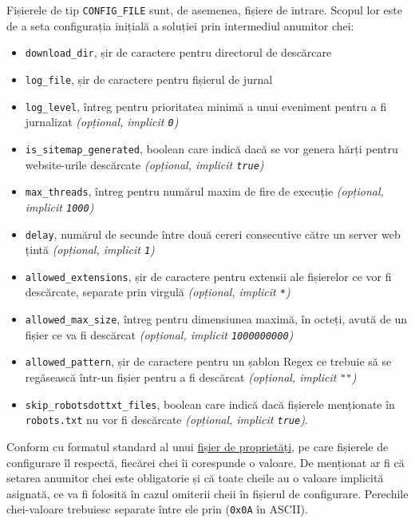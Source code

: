 \documentclass[12pt]{article}
\begin{document}
Fișierele de tip \texttt{CONFIG_FILE} sunt, de asemenea, fișiere de intrare. Scopul lor este de a seta configurația inițială a soluției prin intermediul anumitor chei:
\begin{itemize}
   \item \texttt{download_dir}, șir de caractere pentru directorul de descărcare
    \item \texttt{log_file}, șir de caractere pentru fișierul de jurnal
    \item \texttt{log_level}, întreg pentru prioritatea minimă a unui eveniment pentru a fi jurnalizat \textit{(opțional, implicit \texttt{0})}
    \item \texttt{is_sitemap_generated}, boolean care indică dacă se vor genera hărți pentru website-urile descărcate \textit{(opțional, implicit \texttt{true})}
    \item \texttt{max_threads}, întreg pentru numărul maxim de fire de execuție \textit{(opțional, implicit \texttt{1000})}
    \item \texttt{delay}, numărul de secunde între două cereri consecutive către un server web țintă \textit{(opțional, implicit \texttt{1})}
    \item \texttt{allowed_extensions}, șir de caractere pentru extensii ale fișierelor ce vor fi descărcate, separate prin virgulă \textit{(opțional, implicit \texttt{*})}
    \item \texttt{allowed_max_size}, întreg pentru dimensiunea maximă, în octeți, avută de un fișier ce va fi descărcat \textit{(opțional, implicit \texttt{1000000000})}
    \item \texttt{allowed_pattern}, șir de caractere pentru un șablon Regex ce trebuie să se regăsească într-un fișier pentru a fi descărcat \textit{(opțional, implicit \texttt{""})}
    \item \texttt{skip_robotsdottxt_files}, boolean care indică dacă fișierele menționate în \texttt{robots.txt} nu vor fi descărcate \textit{(opțional, implicit \texttt{true})}.
\end{itemize}

Conform cu formatul standard al unui \href{https://docs.oracle.com/javase/tutorial/essential/environment/properties.html}{fișier de proprietăți}, pe care fișierele de configurare îl respectă, fiecărei chei îi corespunde o valoare. De menționat ar fi că setarea anumitor chei este obligatorie și că toate cheile au o valoare implicită asignată, ce va fi folosită în cazul omiterii cheii în fișierul de configurare. Perechile chei-valoare trebuiesc separate între ele prin \texttt{\n} (\texttt{0x0A} în ASCII).
\end{document}
